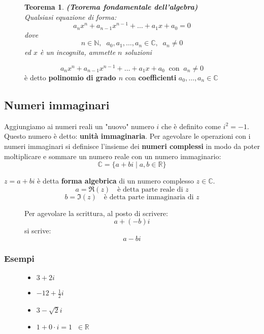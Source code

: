 \documentclass[a4paper]{article}
\newtheorem{theorem}{Teorema}
\theoremstyle{break}
\theoremstyle{break}
\theoremstyle{break}
\theoremstyle{break}
\begin{document}
\begin{figure}[H]
  \begin{theorem}
    \textbf{(Teorema fondamentale dell'algebra)}\\
    Qualsiasi equazione di forma:
    \[
      a_nx^n + a_{n-1}x^{n-1} + \ldots + a_1x + a_0 = 0
    \]
    dove
    \[
      n \in \mathbb{N},\;\; a_0, a_1, \ldots, a_n \in \mathbb{C},\;\; a_n \neq 0
    \]
    ed \( x \) è un incognita, ammette \( n \) soluzioni

  \end{theorem}

  \begin{define}
    \[
      a_nx^n + a_{n-1}x^{n-1} + \ldots + a_1x + a_0 \;\; \text{con} \;\; a_n \neq 0
    \]
    è detto \textbf{polinomio di grado \( n \)} con \textbf{coefficienti} \( a_0, \ldots, a_n \in \mathbb{C} \)
  \end{define}
\end{figure}

\subsection{Numeri immaginari}
Aggiungiamo ai numeri reali un "nuovo" numero $i$ che è definito come $i^2 = -1$. Questo numero
è detto: \textbf{unità immaginaria}. Per agevolare le operazioni con i numeri immaginari si
definisce l'insieme dei \textbf{numeri complessi} in modo da poter moltiplicare e sommare un
numero reale con un numero immaginario:
\[
  \mathbb{C} = \{ a + bi \;|\; a,b \in \mathbb{R} \}
\]

\( z = a + bi \) è detta \textbf{forma algebrica} di un numero complesso \( z \in \mathbb{C} \).
\[
  a = \Re(z) \quad \text{è detta parte reale di } z
\]
\[
  b = \Im(z) \quad \text{è detta parte immaginaria di } z
\]

\begin{figure}[H]
  \begin{define}
    Per agevolare la scrittura, al posto di scrivere:
    \[
      a + (-b)i
    \]
    si scrive:
    \[
      a - bi
    \]
  \end{define}
\end{figure}

\subsubsection{Esempi}
\begin{figure}[H]
  \begin{example}
    \begin{itemize}
      \item $3 + 2i$
      \item $-12 + \frac{1}{2}i$
      \item $3-\sqrt{2}i $
      \item $1+0 \cdot i = 1\;\; \in \mathbb{R}$
    \end{itemize}
  \end{example}
\end{figure}
\end{document}
